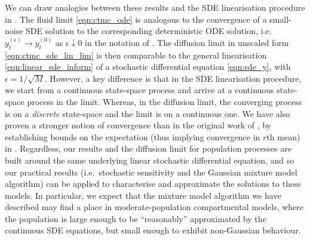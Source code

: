 We can draw analogies between these results and the SDE linearisation procedure in .
The fluid limit \cref{eqn:ctmc_ode} is analogous to the convergence of a small-noise SDE solution to the corresponding deterministic ODE solution, i.e. \(y_t^{(\epsilon)} \to y_t^{(0)}\) as \(\epsilon \downarrow 0\) in the notation of .
The diffusion limit in unscaled form \cref{eqn:ctmc_sde_lin_lim} is then comparable to the general linearisation \cref{eqn:linear_sde_inform} of a stochastic differential equation \cref{eqn:sde_y}, with \(\epsilon = 1/\sqrt{M}\).
However, a key difference is that in the SDE linearisation procedure, we start from a continuous state-space process and arrive at a continuous state-space process in the limit.
Whereas, in the diffusion limit, the converging process is on a \emph{discrete} state-space and the limit is on a continuous one.
We have also proven a stronger notion of convergence than in the original work of \citet{Kurtz_1971_LimitTheoremsSequences,Kurtz_1970_SolutionsOrdinaryDifferential}, by establishing bounds on the expectation (thus implying convergence in \(r\)th mean) in .
Regardless, our results and the diffusion limit for population processes are built around the same underlying linear stochastic differential equation, and so our practical results (i.e.\ stochastic sensitivity and the Gaussian mixture model algorithm) can be applied to characterise and approximate the solutions to these models.
In particular, we expect that the mixture model algorithm we have described may find a place in moderate-population compartmental models, where the population is large enough to be ``reasonably'' approximated by the continuous SDE equations, but small enough to exhibit non-Gaussian behaviour.

